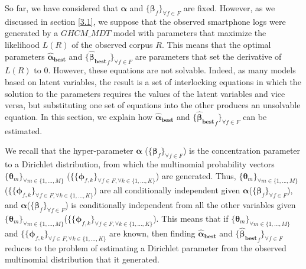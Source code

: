 So far, we have considered that $\boldsymbol{\alpha}$ and $\{\boldsymbol{\beta }_{f}\}_{\forall f\in F}$ are fixed. However, as we discussed in section \ref{3.1}, we suppose that the observed smartphone logs were generated by a $GHCM\_MDT$ model with parameters that maximize the likelihood $L(R)$ of the observed corpus $R$. This means that the optimal parameters $\boldsymbol{\widehat{\alpha}_{best}}$ and $\{\boldsymbol{\widehat{\beta }_{best}}_{f}\}_{\forall f\in F}$ are parameters that set the derivative of $L(R)$ to $0$. However, these equations are not solvable. Indeed, as many models based on latent variables, the result is a set of interlocking equations in which the solution to the parameters requires the values of the latent variables and vice versa, but substituting one set of equations into the other produces an unsolvable equation. In this section, we explain how $\boldsymbol{\widehat{\alpha}_{best}}$ and $\{\boldsymbol{\widehat{\beta }_{best}}_{f}\}_{\forall f\in F}$ can be estimated. \par

We recall that the hyper-parameter $\boldsymbol{\alpha}$ ($\{\boldsymbol{\beta }_{f}\}_{\forall f\in F}$) is the concentration parameter to a Dirichlet distribution, from which the multinomial probability vectors $\{\boldsymbol{\theta}_{m}\}_{\forall m\in \{1,...,M\}}$ ($\{\{\boldsymbol{\phi }_{f,k}\}_{\forall f \in F, \forall k\in\{1,...,K\}}$) are generated. Thus, $\{\boldsymbol{\theta}_{m}\}_{\forall m\in \{1,...,M\}}$ ($\{\{\boldsymbol{\phi }_{f,k}\}_{\forall f \in F, \forall k\in\{1,...,K\}}$) are all conditionally independent given $\boldsymbol{\alpha}$($\{\boldsymbol{\beta }_{f}\}_{\forall f\in F}$), and $\boldsymbol{\alpha}$($\{\boldsymbol{\beta }_{f}\}_{\forall f\in F}$) is conditionally independent from all the other variables given $\{\boldsymbol{\theta}_{m}\}_{\forall m\in \{1,...,M\}}$($\{\{\boldsymbol{\phi }_{f,k}\}_{\forall f \in F, \forall k\in\{1,...,K\}}$). This means that if $\{\boldsymbol{\theta}_{m}\}_{\forall m\in \{1,...,M\}}$ and $\{\{\boldsymbol{\phi }_{f,k}\}_{\forall f \in F, \forall k\in\{1,...,K\}}$ are known, then finding $\boldsymbol{\widehat{\alpha}_{best}}$ and $\{\boldsymbol{\widehat{\beta }_{best}}_{f}\}_{\forall f\in F}$ reduces to the problem of estimating a Dirichlet parameter from the observed multinomial distribution that it generated. \par

